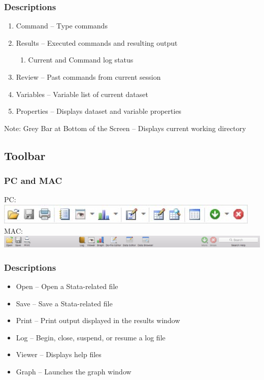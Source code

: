 \documentclass{beamer}
\begin{document}
\begin{frame}
	\frametitle{Descriptions}
		\begin{enumerate}
			\item Command -- Type commands
			\item Results -- Executed commands and resulting output
			\begin{enumerate}
				\item Current and Command log status
			\end{enumerate}
			\item Review -- Past commands from current session
			\item Variables -- Variable list of current dataset
			\item Properties -- Displays dataset and variable properties
		\end{enumerate}
		Note: Grey Bar at Bottom of the Screen -- Displays current working directory
\end{frame}

\subsection{Toolbar}

\begin{frame}
	\frametitle{PC and MAC}
		PC: \includegraphics[scale=0.75]{toolbar_pc} \\
		MAC: \includegraphics[scale=0.25]{toolbar_mac}
\end{frame}

\begin{frame}
	\frametitle{Descriptions}
		\begin{itemize}
			\item Open -- Open a Stata-related file
			\item Save -- Save a Stata-related file
			\item Print -- Print output displayed in the results window
			\item Log -- Begin, close, suspend, or resume a log file
			\item Viewer -- Displays help files
			\item Graph -- Launches the graph window
		\end{itemize}
\end{frame}
\end{document}
